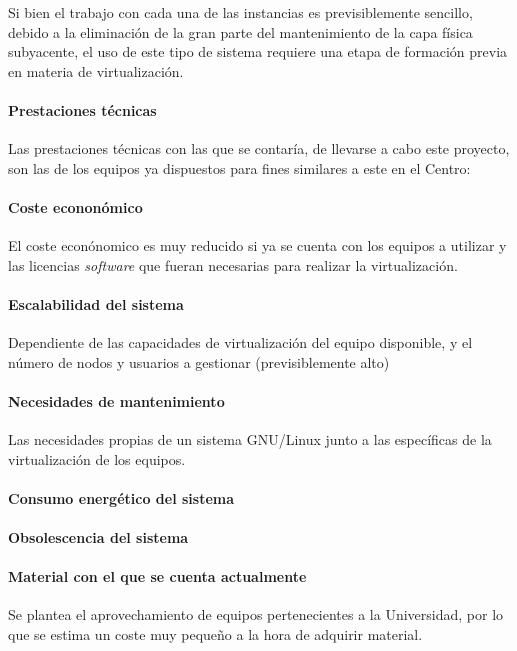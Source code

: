 Si bien el trabajo con cada una de las instancias es previsiblemente sencillo, debido a la eliminación de la gran parte del mantenimiento de la capa física subyacente, el uso de este tipo de sistema requiere una etapa de formación previa en materia de virtualización.

\paragraph{Prestaciones técnicas}

Las prestaciones técnicas con las que se contaría, de llevarse a cabo este proyecto, son las de los equipos ya dispuestos para fines similares a este en el Centro: %

\paragraph{Coste econonómico}

El coste econónomico es muy reducido si ya se cuenta con los equipos a utilizar y las licencias \textit{software} que fueran necesarias para realizar la virtualización.

\paragraph{Escalabilidad del sistema}

Dependiente de las capacidades de virtualización del equipo disponible, y el número de nodos y usuarios a gestionar (previsiblemente alto)

\paragraph{Necesidades de mantenimiento}

Las necesidades propias de un sistema GNU/Linux junto a las específicas de la virtualización de los equipos.

\paragraph{Consumo energético del sistema}
\paragraph{Obsolescencia del sistema}

\paragraph{Material con el que se cuenta actualmente}
Se plantea el aprovechamiento de equipos pertenecientes a la Universidad, por lo que se estima un coste muy pequeño a la hora de adquirir material.
